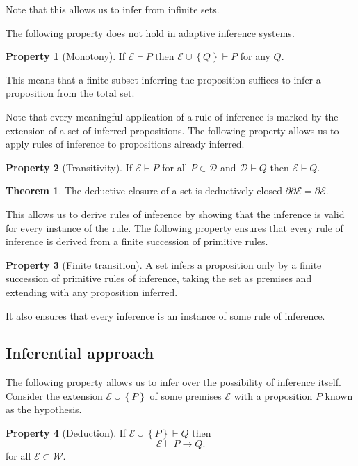 \documentclass{amsbook}
\newcommand{\setsm}[1]{\left\{#1\right\}}
\newcommand{\wffs}{\mathcal W}
\newcommand{\infers}{\mathrel\vdash}
\newcommand{\then}{\mathrel\rightarrow}
\theoremstyle{definition}
\newtheorem{prop}{Property}[section]
\newtheorem{subprop}[prop]{Property}
\newtheorem{thm}{Theorem}[section]
\begin{document}
Note that this allows us to infer from infinite sets.

The following property does not hold in adaptive inference systems.

\begin{prop}[Monotony]
    If $\mathcal E \infers P$ then $\mathcal E \cup \setsm Q \infers P$ for any $Q$.
\end{prop}

This means that a finite subset inferring the proposition suffices to infer a proposition from the total set.

Note that every meaningful application of a rule of inference is marked by the extension of a set of inferred propositions. The following property allows us to apply rules of inference to propositions already inferred.

\begin{prop}[Transitivity]
    If $\mathcal E \infers P$ for all $P \in \mathcal D$ and $\mathcal D \infers Q$ then $\mathcal E \infers Q$.
\end{prop}

\begin{thm}
    The deductive closure of a set is deductively closed $\partial\partial\mathcal E = \partial\mathcal E$.
\end{thm}

This allows us to derive rules of inference by showing that the inference is valid for every instance of the rule. The following property ensures that every rule of inference is derived from a finite succession of primitive rules.

\begin{prop}[Finite transition]
    A set infers a proposition only by a finite succession of primitive rules of inference, taking the set as premises and extending with any proposition inferred.
\end{prop}

It also ensures that every inference is an instance of some rule of inference.

\subsection{Inferential approach}

The following property allows us to infer over the possibility of inference itself. Consider the extension $\mathcal E \cup\setsm P$ of some premises $\mathcal E$ with a proposition $P$ known as the hypothesis.

\begin{subprop}[Deduction]
    If $\mathcal E \cup\setsm P \infers Q$ then
    $$\mathcal E \infers P \then Q.$$
    for all $\mathcal E \subset \wffs$.
\end{subprop}
\end{document}
